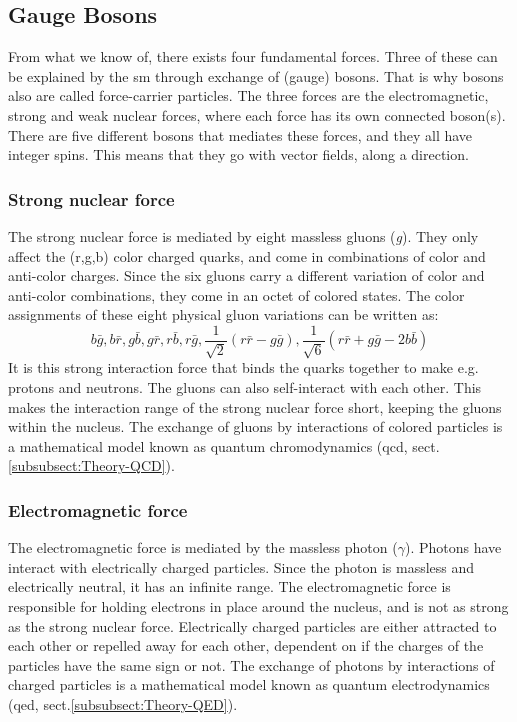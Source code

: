 \documentclass[a4paper, american, 12pt]{report}
\begin{document}
	\subsection{Gauge Bosons}
	\label{subsect:Theory-Bosons}
	From what we know of, there exists four fundamental forces. Three of these can be explained by the \acrshort{sm} through exchange of (gauge) bosons. That is why bosons also are called force-carrier particles. The three forces are the electromagnetic, strong and weak nuclear forces, where each force has its own connected boson(s). There are five different bosons that mediates these forces, and they all have integer spins. This means that they go with vector fields, along a direction.
	
		
	\subsubsection{Strong nuclear force} 
	\label{subsubsect:Theory-Strong_Force}
	The strong nuclear force is mediated by eight massless gluons (\textit{g}). They only affect the (r,g,b) color charged quarks, and come in combinations of color and anti-color charges. Since the six gluons carry a different variation of color and anti-color combinations, they come in an octet of colored states. The color assignments of these eight physical gluon variations can be written as:
	\[b\bar{g}, b\bar{r}, g\bar{b}, g\bar{r}, r\bar{b}, r\bar{g},\frac{1}{\sqrt{2}}(r\bar{r}-g\bar{g}), \frac{1}{\sqrt{6}}(r\bar{r}+g\bar{g}-2b\bar{b})\] 
	It is this strong interaction force that binds the quarks together to make e.g. protons and neutrons. The gluons can also self-interact with each other. This makes the interaction range of the strong nuclear force short, keeping the gluons within the nucleus. The exchange of gluons by interactions of colored particles is a mathematical model known as quantum chromodynamics (\acrshort{qcd}, sect.\ref{subsubsect:Theory-QCD}).
	
	
	\subsubsection{Electromagnetic force}
	\label{subsubsect:Theory-EM_Force}
	The electromagnetic force is mediated by the massless photon ($\gamma$). Photons have interact with electrically charged particles. Since the photon is massless and electrically neutral, it has an infinite range. The electromagnetic force is responsible for holding electrons in place around the nucleus, and is not as strong as the strong nuclear force. Electrically charged particles are either attracted to each other or repelled away for each other, dependent on if the charges of the particles have the same sign or not. The exchange of photons by interactions of charged particles is a mathematical model known as quantum electrodynamics (\acrshort{qed}, sect.\ref{subsubsect:Theory-QED}).
	
\end{document}
